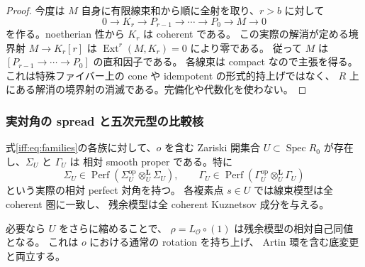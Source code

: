 \begin{proof}
今度は $M$ 自身に有限線束和から順に全射を取り、$r>b$ に対して
\[
 0\longrightarrow K_r\longrightarrow P_{r-1}\longrightarrow\cdots
 \longrightarrow P_0\longrightarrow M\longrightarrow0
\]
を作る。noetherian 性から $K_r$ は coherent である。
この実際の解消が定める境界射 $M\to K_r[r]$ は
$\operatorname{Ext}^r(M,K_r)=0$ により零である。
従って $M$ は $[P_{r-1}\to\cdots\to P_0]$ の直和因子である。
各線束は compact なので主張を得る。
これは特殊ファイバー上の cone や idempotent の形式的持上げではなく、
$R$ 上にある解消の境界射の消滅である。完備化や代数化を使わない。
\end{proof}

\subsubsection{実対角の spread と五次元型の比較核}

\begin{theorem}
\label{iff:thm:smooth-neighborhood}
式\eqref{iff:eq:families}の各族に対して、$o$ を含む Zariski 開集合
$U\subset\operatorname{Spec}R_0$ が存在し、$\Sigma_U$ と $\Gamma_U$ は
相対 smooth proper である。特に
\[
 \Sigma_U\in\operatorname{Perf}
  (\Sigma_U^{\mathrm{op}}\otimes_U^{\mathbf L}\Sigma_U),\qquad
 \Gamma_U\in\operatorname{Perf}
  (\Gamma_U^{\mathrm{op}}\otimes_U^{\mathbf L}\Gamma_U)
\]
という実際の相対 perfect 対角を持つ。
各複素点 $s\in U$ では線束模型は全 coherent 圏に一致し、
残余模型は全 coherent Kuznetsov 成分を与える。

必要なら $U$ をさらに縮めることで、
$\rho=L_{\mathcal O}\circ(1)$ は残余模型の相対自己同値となる。
これは $o$ における通常の rotation を持ち上げ、
Artin 環を含む底変更と両立する。
\end{theorem}

